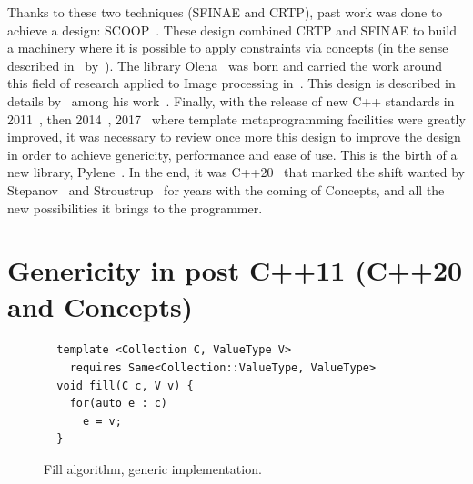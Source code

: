 Thanks to these two techniques (SFINAE and CRTP), past work was done to achieve a design:
SCOOP~\parencite{burrus.2003.mpool,geraud.2006.scoop-pres,geraud.2008.mpool}. These design combined CRTP and SFINAE to
build a machinery where it is possible to apply constraints via concepts (in the sense described
in~ by~\citeauthor{stepanov.2009.elements}). The library
Olena~\parencite{olena.2000.www,geraud.2012.hdr} was born and carried the work around this field of research applied to
Image processing in~\parencite{geraud.2000.icpr,duretlutz.2000.olena,darbon.2002.ismm,darbon.2004.ecoopphd}. This design
is described in details by~\citeauthor{levillain.2011.phd} among his
work~\parencite{levillain.2009.ismm,levillain.2010.icip,levillain.2010.wadgmm,levillain.2011.gretsi,levillain.2011.phd,levillain.2012.wadgmm-lncs,levillain.2014.ciarp}.
Finally, with the release of new C++ standards in 2011~\parencite{iso.2011.cpp}, then 2014~\parencite{iso.2014.cpp},
2017~\parencite{iso.2017.cpp} where template metaprogramming facilities were greatly improved, it was necessary to
review once more this design to improve the design in order to achieve genericity, performance and ease of use. This is
the birth of a new library, Pylene~\parencite{carlinet.2018.pylena}. In the end, it was C++20~\parencite{iso.2011.cpp}
that marked the shift wanted by
Stepanov~\parencite{musser.1988.generic,musser.1994.algorithm,dehnert.1998.fundamentals,stepanov.2009.elements} and
Stroustrup~\parencite{stroustrup.1995.design,stroustrup.1999.hot,stroustrup.2003.concepts,stroustrup.2007.hopl} for
years with the coming of Concepts, and all the new possibilities it brings to the programmer.


\section{Genericity in post C++11 (C++20 and Concepts)}
\label{sec:postcpp11}

\begin{figure}[tbh]
  \centering
  \begin{verbatim}
  template <Collection C, ValueType V>
    requires Same<Collection::ValueType, ValueType>
  void fill(C c, V v) {
    for(auto e : c)
      e = v;
  }
  \end{verbatim}

  \caption{Fill algorithm, generic implementation.}
  \label{code:gen.fill}
\end{figure}

